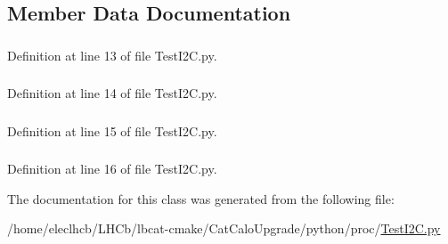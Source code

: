 \subsection{Member Data Documentation}
\hypertarget{classTestI2C_1_1TestI2C_a00d57a9891262d6929a7c788ef4a4d66}{
\subsubsection[{s1}]{}}
\label{classTestI2C_1_1TestI2C_a00d57a9891262d6929a7c788ef4a4d66}


Definition at line 13 of file TestI2C.py.\hypertarget{classTestI2C_1_1TestI2C_ab4812bf64775a479e0580e7f36b7bfef}{
\subsubsection[{s2}]{}}
\label{classTestI2C_1_1TestI2C_ab4812bf64775a479e0580e7f36b7bfef}


Definition at line 14 of file TestI2C.py.\hypertarget{classTestI2C_1_1TestI2C_a2d30fcf71b708351db5027bebcd70b6e}{
\subsubsection[{s3}]{}}
\label{classTestI2C_1_1TestI2C_a2d30fcf71b708351db5027bebcd70b6e}


Definition at line 15 of file TestI2C.py.\hypertarget{classTestI2C_1_1TestI2C_a30d6040b97028171387aa0b6edc158ef}{
\subsubsection[{s4}]{}}
\label{classTestI2C_1_1TestI2C_a30d6040b97028171387aa0b6edc158ef}


Definition at line 16 of file TestI2C.py.

The documentation for this class was generated from the following file:\begin{DoxyCompactItemize}
\item 
/home/eleclhcb/LHCb/lbcat-\/cmake/CatCaloUpgrade/python/proc/\hyperlink{TestI2C_8py}{TestI2C.py}\end{DoxyCompactItemize}
